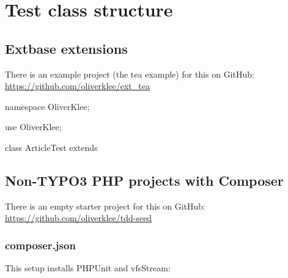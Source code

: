 \documentclass[a4paper,11pt,headsepline]{scrartcl}
\begin{document}
\pagebreak
\section{Test class structure}

\subsection{Extbase extensions}

There is an example project (the tea example) for this on GitHub:\\
\url{https://github.com/oliverklee/ext_tea}

\begin{phpcode}
namespace OliverKlee\Shop\Tests\Unit\Domain\Model;

use OliverKlee\Shop\Domain\Model\Article;

class ArticleTest extends \CMS\Core\Tests{}
\end{phpcode}


\subsection{Non-TYPO3 PHP projects with Composer}

There is an empty starter project for this on GitHub:\\
\url{https://github.com/oliverklee/tdd-seed}


\subsubsection{composer.json}

This setup installs PHPUnit and vfsStream:
\end{document}
